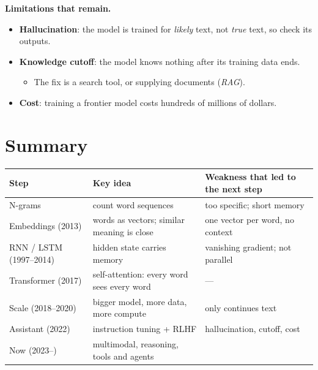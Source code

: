 \documentclass[12pt, a4paper]{article}
\begin{document}
\begin{warnbox}
  \textbf{Limitations that remain.}
  \begin{itemize}
    \item \textbf{Hallucination}: the model is trained for \emph{likely}
          text, not \emph{true} text, so check its outputs.
    \item \textbf{Knowledge cutoff}: the model knows nothing after its
          training data ends.
          \begin{itemize}
            \item The fix is a search tool, or supplying documents
                  (\emph{RAG}).
          \end{itemize}
    \item \textbf{Cost}: training a frontier model costs hundreds of millions
          of dollars.
  \end{itemize}
\end{warnbox}

\section{Summary}
\label{sec:summary}

\begin{center}
  \renewcommand{\arraystretch}{1.4}
  \begin{tabular}{>{\raggedright}p{2.6cm}>{\raggedright}p{5.4cm}>{\raggedright\arraybackslash}p{5.4cm}}
    \toprule
    Step                    & Key idea                                   & Weakness that led to the next step \\
    \midrule
    N-grams                 & count word sequences                       & too specific; short memory         \\
    Embeddings (2013)       & words as vectors; similar meaning is close & one vector per word, no context    \\
    RNN / LSTM (1997--2014) & hidden state carries memory                & vanishing gradient; not parallel   \\
    Transformer (2017)      & self-attention: every word sees every word & ---                                \\
    Scale (2018--2020)      & bigger model, more data, more compute      & only continues text                \\
    Assistant (2022)        & instruction tuning + RLHF                  & hallucination, cutoff, cost        \\
    Now (2023--)            & multimodal, reasoning, tools and agents    &                                    \\
    \bottomrule
  \end{tabular}
\end{center}
\end{document}
